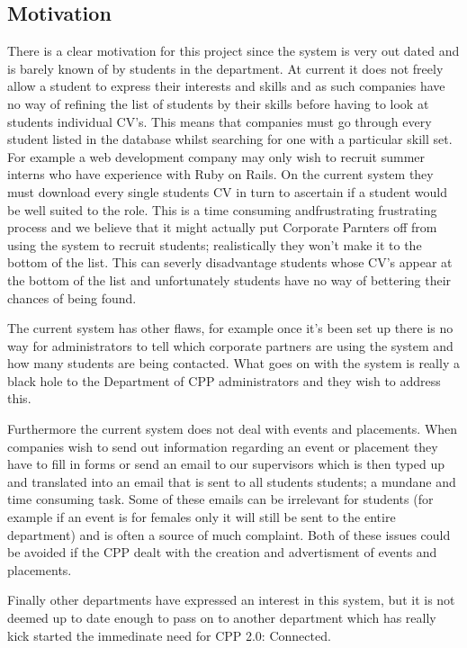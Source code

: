 \subsection{Motivation}
  There is a clear motivation for this project since the system is very out dated and is barely known of by students in the department.
  At current it does not freely allow a student to express their interests and skills and as such companies have no way of refining the list of students by their skills before having to look at students individual CV's. This means that companies must go through every student listed in the database whilst searching for one with a particular skill set. For example a web development company may only wish to recruit summer interns who have experience with Ruby on Rails. On the current system they must download every single students CV in turn to ascertain if a student would be well suited to the role. This is a time consuming andfrustrating frustrating process and we believe that it might actually put Corporate Parnters off from using the system to recruit students; realistically they won't make it to the bottom of the list.
  This can severly disadvantage students whose CV's appear at the bottom of the list and unfortunately students have
  no way of bettering their chances of being found.

  The current system has other flaws, for example once it's been set up there is no way for administrators to tell which corporate partners are using the system and how many students are being contacted. What goes on with the system is really a black hole to the Department of CPP administrators and they wish to address this. 

  Furthermore the current system does not deal with events and placements. When companies wish to send out information regarding an event or placement they have to fill in forms or send an email to our supervisors which is then typed up and translated into an email that is sent to all students students; a mundane and time consuming task. Some of these emails can be irrelevant for students (for example if an event is for females only it will still be sent to the entire department) and is often a source of much complaint. 
  Both of these issues could be avoided if the CPP dealt with the creation and advertisment of events and placements.

  Finally other departments have expressed an interest in this system, but it is not deemed up to date enough to pass on to another department which has really kick started the immedinate need for CPP 2.0: Connected.